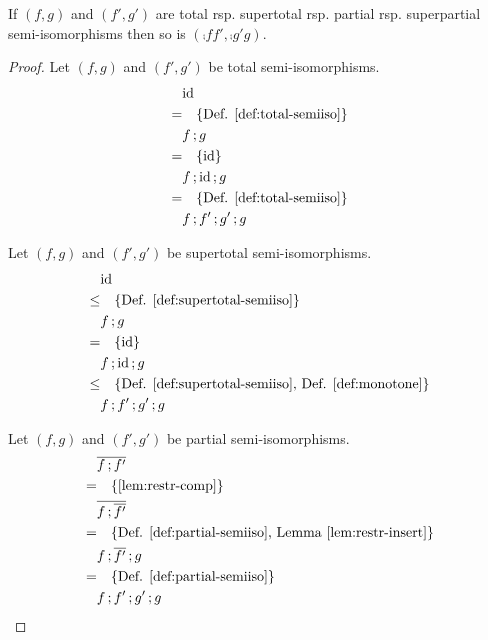 \documentclass[runningheads,envcountsame]{llncs}
\begin{document}
\begin{lemma}
    If $(f, g)$ and $(f', g')$ are total rsp. supertotal rsp. partial rsp. superpartial semi-isomorphisms then so is $(\comp{f}{f'}, \comp{g'}{g})$.
\end{lemma}
\begin{proof}
    Let $(f, g)$ and $(f', g')$ be total semi-isomorphisms.
    \begin{align}
        & \id \\
    =   & \quad\text{\{Def. \ref{def:total-semiiso}\}} \\
        & \comp{f}{g} \\
    =   & \quad\text{\{$\id$\}} \\
        & \comp{f}{\comp{\id}{g}} \\
    =   & \quad\text{\{Def. \ref{def:total-semiiso}\}} \\
        & \comp{\comp{f}{\comp{f'}{g'}}}{g}
    \end{align}
    
    Let $(f, g)$ and $(f', g')$ be supertotal semi-isomorphisms.
    \begin{align}
        & \id \\
    \leq & \quad\text{\{Def. \ref{def:supertotal-semiiso}\}} \\
        & \comp{f}{g} \\
    = & \quad\text{\{$\id$\}} \\
        & \comp{f}{\comp{\id}{g}} \\
    \leq & \quad\text{\{Def. \ref{def:supertotal-semiiso}, Def. \ref{def:monotone}\}} \\
        & \comp{\comp{f}{\comp{f'}{g'}}}{g}
    \end{align}
    
    Let $(f, g)$ and $(f', g')$ be partial semi-isomorphisms.
    \begin{align}
        & \overline{\comp{f}{f'}} \\
    =   & \quad\text{\{\ref{lem:restr-comp}\}} \\
        & \overline{\comp{f}{\overline{f'}}} \\
    =   & \quad\text{\{Def. \ref{def:partial-semiiso}, Lemma \ref{lem:restr-insert}\}} \\
        & \comp{\comp{f}{\overline{f'}}}{g} \\
    =   & \quad\text{\{Def. \ref{def:partial-semiiso}\}} \\
        & \comp{\comp{f}{\comp{f'}{g'}}}{g}
    \end{align}
    

\end{proof}
\end{document}
